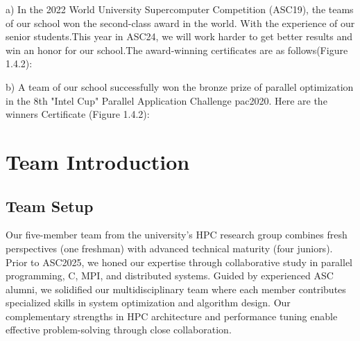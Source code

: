 \documentclass[a4paper,12pt]{article}
\begin{document}
a) In the 2022 World University Supercomputer Competition (ASC19), the teams of our school won the second-class award in the world. With the experience of our senior students.This year in ASC24, we will work harder to get better results and win an honor for our school.The award-winning certificates are as follows(Figure 1.4.2):

b) A team of our school successfully won the bronze prize of parallel optimization in the 8th "Intel Cup" Parallel Application Challenge pac2020. Here are the winners Certificate (Figure 1.4.2):

\newpage

\section{Team Introduction}

\subsection{Team Setup}

Our five-member team from the university's HPC research group combines fresh perspectives (one freshman) with advanced technical maturity (four juniors). Prior to ASC2025, we honed our expertise through collaborative study in parallel programming, C, MPI, and distributed systems. Guided by experienced ASC alumni, we solidified our multidisciplinary team where each member contributes specialized skills in system optimization and algorithm design. Our complementary strengths in HPC architecture and performance tuning enable effective problem-solving through close collaboration.
\end{document}
